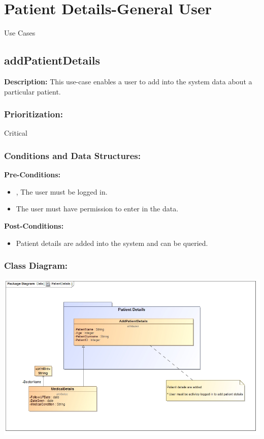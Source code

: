 

\section{Patient Details-General User}

\Large{Use Cases}


\subsection{addPatientDetails}
\textbf{Description:}
This use-case enables a user to add into the system data about a particular patient.
\subsubsection{Prioritization:}
Critical
\subsubsection{Conditions and Data Structures:}
\textbf{Pre-Conditions:}
\begin{itemize}
	\item , The user must be logged in.
	\item The user must have permission to enter in the data.
\end{itemize}

\textbf{Post-Conditions:}	
\begin{itemize}
	\item Patient details are added into the system and can be queried.
\end{itemize}

\subsubsection{Class Diagram:} 
\includegraphics[width=1\linewidth]{./Graphics/addPatient}





